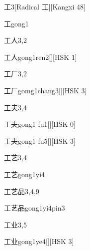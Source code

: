 \begin{entry}{工}{3}[Radical 工][Kangxi 48]
  \begin{phonetics}{工}{gong1}
  \end{phonetics}
\end{entry}

\begin{entry}{工人}{3,2}
  \begin{phonetics}{工人}{gong1ren2}[][HSK 1]
  \end{phonetics}
\end{entry}

\begin{entry}{工厂}{3,2}
  \begin{phonetics}{工厂}{gomg1chang3}[][HSK 3]
  \end{phonetics}
\end{entry}

\begin{entry}{工夫}{3,4}
  \begin{phonetics}{工夫}{gong1 fu1}[][HSK 0]
  \end{phonetics}
  \begin{phonetics}{工夫}{gong1 fu5}[][HSK 3]
  \end{phonetics}
\end{entry}

\begin{entry}{工艺}{3,4}
  \begin{phonetics}{工艺}{gong1yi4}
  \end{phonetics}
\end{entry}

\begin{entry}{工艺品}{3,4,9}
  \begin{phonetics}{工艺品}{gong1yi4pin3}
  \end{phonetics}
\end{entry}

\begin{entry}{工业}{3,5}
  \begin{phonetics}{工业}{gong1ye4}[][HSK 3]
  \end{phonetics}
\end{entry}

